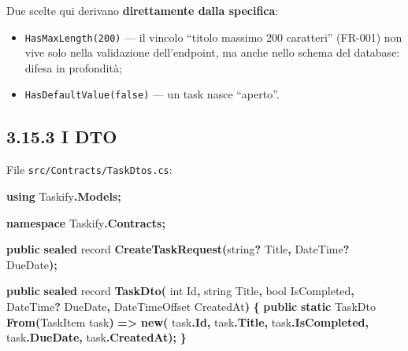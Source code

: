 \documentclass[
  italian,
  10pt,
]{book}
\newenvironment{Shaded}{\begin{snugshade}}{\end{snugshade}}
\newcommand{\DataTypeTok}[1]{\textcolor[rgb]{0.13,0.29,0.53}{#1}}
\newcommand{\FunctionTok}[1]{\textcolor[rgb]{0.13,0.29,0.53}{\textbf{#1}}}
\newcommand{\KeywordTok}[1]{\textcolor[rgb]{0.13,0.29,0.53}{\textbf{#1}}}
\newcommand{\NormalTok}[1]{#1}
\newcommand{\OperatorTok}[1]{\textcolor[rgb]{0.81,0.36,0.00}{\textbf{#1}}}
\providecommand{\tightlist}{%
  \setlength{\itemsep}{0pt}\setlength{\parskip}{0pt}}
\begin{document}
Due scelte qui derivano \textbf{direttamente dalla specifica}:

\begin{itemize}
\tightlist
\item
  \texttt{HasMaxLength(200)} --- il vincolo ``titolo massimo 200
  caratteri'' (FR-001) non vive solo nella validazione dell'endpoint, ma
  anche nello schema del database: difesa in profondità;
\item
  \texttt{HasDefaultValue(false)} --- un task nasce ``aperto''.
\end{itemize}

\subsection{3.15.3 I DTO}\label{i-dto}

File \texttt{src/Contracts/TaskDtos.cs}:

\begin{Shaded}
\begin{Highlighting}[]
\KeywordTok{using}\NormalTok{ Taskify}\OperatorTok{.}\FunctionTok{Models}\OperatorTok{;}

\KeywordTok{namespace}\NormalTok{ Taskify}\OperatorTok{.}\FunctionTok{Contracts}\OperatorTok{;}

\KeywordTok{public} \KeywordTok{sealed}\NormalTok{ record }\FunctionTok{CreateTaskRequest}\OperatorTok{(}\DataTypeTok{string}\OperatorTok{?}\NormalTok{ Title}\OperatorTok{,}\NormalTok{ DateTime}\OperatorTok{?}\NormalTok{ DueDate}\OperatorTok{);}

\KeywordTok{public} \KeywordTok{sealed}\NormalTok{ record }\FunctionTok{TaskDto}\OperatorTok{(}
    \DataTypeTok{int}\NormalTok{ Id}\OperatorTok{,}
    \DataTypeTok{string}\NormalTok{ Title}\OperatorTok{,}
    \DataTypeTok{bool}\NormalTok{ IsCompleted}\OperatorTok{,}
\NormalTok{    DateTime}\OperatorTok{?}\NormalTok{ DueDate}\OperatorTok{,}
\NormalTok{    DateTimeOffset CreatedAt}\OperatorTok{)}
\OperatorTok{\{}
    \KeywordTok{public} \KeywordTok{static}\NormalTok{ TaskDto }\FunctionTok{From}\OperatorTok{(}\NormalTok{TaskItem task}\OperatorTok{)} \OperatorTok{=\textgreater{}} \KeywordTok{new}\OperatorTok{(}
\NormalTok{        task}\OperatorTok{.}\FunctionTok{Id}\OperatorTok{,}
\NormalTok{        task}\OperatorTok{.}\FunctionTok{Title}\OperatorTok{,}
\NormalTok{        task}\OperatorTok{.}\FunctionTok{IsCompleted}\OperatorTok{,}
\NormalTok{        task}\OperatorTok{.}\FunctionTok{DueDate}\OperatorTok{,}
\NormalTok{        task}\OperatorTok{.}\FunctionTok{CreatedAt}\OperatorTok{);}
\OperatorTok{\}}
\end{Highlighting}
\end{Shaded}
\end{document}

